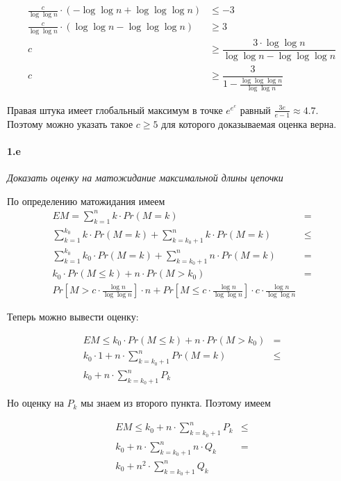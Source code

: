 \documentclass[russian]{article}
\begin{document}
\begin{align*}
\frac{c}{\log \log n} \cdot (- \log \log n + \log \log \log n) &\leqslant -3 \\
\frac{c}{\log \log n} \cdot (\log \log n - \log \log \log n) &\geqslant 3 \\
c &\geqslant \dfrac{3 \cdot \log \log n}{\log \log n - \log \log \log n} \\
c &\geqslant \dfrac{3}{1 - \frac{ \log \log \log n}{\log \log n}}
\end{align*}

Правая штука имеет глобальный максимум в точке $e^{e^e}$ равный $\frac{3e}{e-1} \approx 4.7$. Поэтому можно указать такое $c \geqslant 5$ для которого доказываемая оценка верна.

\paragraph*{1.e} 

\textit{Доказать оценку на матожидание максимальной длины цепочки}

По определению матожидания имеем
\begin{align*}
EM = \sum_{k=1}^{n}{k \cdot Pr(M = k)} &= \\
\sum_{k=1}^{k_0}{k \cdot Pr(M = k)} + \sum_{k=k_0 + 1}^{n}{k \cdot Pr(M = k)} &\leqslant \\
\sum_{k=1}^{k_0}{k_0 \cdot Pr(M = k)} + \sum_{k=k_0 + 1}^{n}{n \cdot Pr(M = k)} & = \\
k_0 \cdot Pr(M \leqslant k) + n \cdot Pr(M > k_0) & = \\
Pr\left[M > c \cdot \frac{\log n}{\log \log n}\right] \cdot n + Pr\left[M \leqslant c \cdot \frac{\log n}{\log \log n}\right] \cdot c \cdot \frac{\log n}{\log \log n}
\end{align*}

Теперь можно вывести оценку:

\begin{align*}
EM \leqslant k_0 \cdot Pr(M \leqslant k) + n \cdot Pr(M > k_0) & = \\
k_0 \cdot 1 + n \cdot \sum_{k=k_0 + 1}^{n}{Pr(M = k)} & \leqslant \\
k_0 + n \cdot \sum_{k=k_0 + 1}^{n}{P_k}&
\end{align*}

Но оценку на $P_k$ мы знаем из второго пункта. Поэтому имеем

\begin{align*}
EM \leqslant k_0 + n \cdot \sum_{k=k_0 + 1}^{n}{P_k} & \leqslant \\
k_0 + n \cdot \sum_{k=k_0 + 1}^{n}{n \cdot Q_k} & = \\
k_0 + n^2 \cdot \sum_{k=k_0 + 1}^{n}{Q_k}&
\end{align*}
\end{document}

